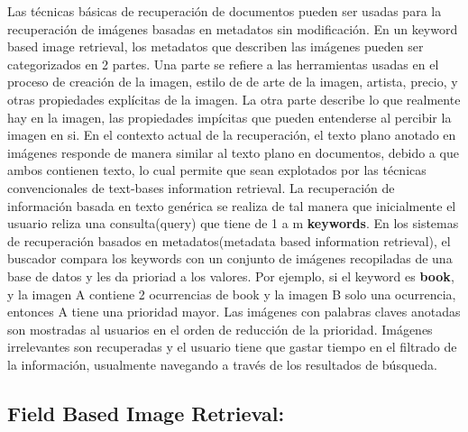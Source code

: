 \documentclass{llncs}
\begin{document}
Las t\'ecnicas b\'asicas de recuperaci\'on de documentos pueden ser usadas para la recuperaci\'on
de im\'agenes basadas en metadatos sin modificaci\'on. En un keyword based image
retrieval, los metadatos que describen las im\'agenes pueden ser categorizados en 2
partes. Una parte se refiere a las herramientas usadas en el proceso de creaci\'on de la imagen, estilo de
de arte de la imagen, artista, precio, y otras propiedades expl\'icitas de la imagen. La otra parte describe
lo que realmente hay en la imagen, las propiedades imp\'icitas que pueden entenderse al 
percibir la imagen en si. En el contexto actual de la recuperaci\'on, el texto plano anotado en im\'agenes
responde de manera similar al texto plano en documentos, debido a que ambos contienen texto, lo cual permite
que sean explotados por las t\'ecnicas convencionales de text-bases information retrieval. La recuperaci\'on de
informaci\'on basada en texto gen\'erica se realiza de tal manera que inicialmente el usuario reliza una
consulta(query) que tiene de 1 a m \textbf{keywords}. En los sistemas de recuperaci\'on basados en 
metadatos(metadata based information retrieval), el buscador compara los keywords con un conjunto de im\'agenes 
recopiladas de una base de datos y les da prioriad a los valores. Por ejemplo, si el keyword es \textbf{book}, y la 
imagen A contiene 2 ocurrencias de book y la imagen B solo una ocurrencia, entonces A tiene una prioridad mayor.  Las 
im\'agenes con palabras claves anotadas son mostradas al usuarios en el orden de reducci\'on de la prioridad. Im\'agenes 
irrelevantes son recuperadas y el usuario tiene que gastar tiempo en el filtrado de la informaci\'on, usualmente navegando
a trav\'es de los resultados de b\'usqueda. 

\subsection{Field Based Image Retrieval:}

\newpage
\end{document}
